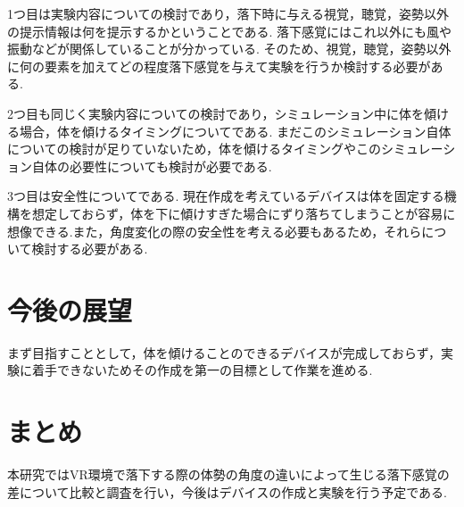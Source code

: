 \documentclass[uplatex]{jsarticle}
\begin{document}
1つ目は実験内容についての検討であり，落下時に与える視覚，聴覚，姿勢以外の提示情報は何を提示するかということである.
落下感覚にはこれ以外にも風や振動などが関係していることが分かっている\cite{青木誠也2018音と風によって浮遊感を感じさせる装置の制作}.
そのため、視覚，聴覚，姿勢以外に何の要素を加えてどの程度落下感覚を与えて実験を行うか検討する必要がある.

2つ目も同じく実験内容についての検討であり，シミュレーション中に体を傾ける場合，体を傾けるタイミングについてである.
まだこのシミュレーション自体についての検討が足りていないため，体を傾けるタイミングやこのシミュレーション自体の必要性についても検討が必要である.

3つ目は安全性についてである.
現在作成を考えているデバイスは体を固定する機構を想定しておらず，体を下に傾けすぎた場合にずり落ちてしまうことが容易に想像できる.また，角度変化の際の安全性を考える必要もあるため，それらについて検討する必要がある.

\section{今後の展望}
まず目指すこととして，体を傾けることのできるデバイスが完成しておらず，実験に着手できないためその作成を第一の目標として作業を進める.

\section{まとめ}
本研究ではVR環境で落下する際の体勢の角度の違いによって生じる落下感覚の差について比較と調査を行い，今後はデバイスの作成と実験を行う予定である.


 
\end{document}
